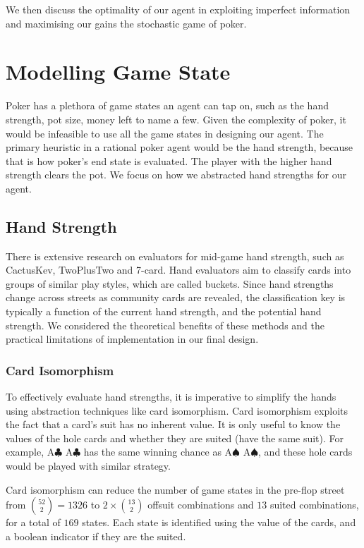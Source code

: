 \documentclass{article}
\begin{document}
We then discuss the optimality of our agent in exploiting imperfect information and maximising our gains the stochastic game of poker.

\section{Modelling Game State}
Poker has a plethora of game states an agent can tap on, such as the hand strength, pot size, money left to name a few. Given the complexity of poker, it would be infeasible to use all the game states in designing our agent. The primary heuristic in a rational poker agent would be the hand strength, because that is how poker's end state is evaluated. The player with the higher hand strength clears the pot. We focus on how we abstracted hand strengths for our agent.

\subsection{Hand Strength}
There is extensive research on evaluators for mid-game hand strength, such as CactusKev, TwoPlusTwo and 7-card. Hand evaluators aim to classify cards into groups of similar play styles, which are called buckets. Since hand strengths change across streets as community cards are revealed, the classification key is typically a function of the current hand strength, and the potential hand strength. We considered the theoretical benefits of these methods and the practical limitations of implementation in our final design.

\subsubsection{Card Isomorphism}
To effectively evaluate hand strengths, it is imperative to simplify the hands using abstraction techniques like card isomorphism. Card isomorphism exploits the fact that a card's suit has no inherent value. It is only useful to know the values of the hole cards and whether they are suited (have the same suit). For example, A$\clubsuit$ A$\clubsuit$ has the same winning chance as A$\spadesuit$ A$\spadesuit$, and these hole cards would be played with similar strategy.

Card isomorphism can reduce the number of game states in the pre-flop street from ${52 \choose 2} = 1326$ to $2 \times {13 \choose 2}$ offsuit combinations and $13$ suited combinations, for a total of $169$ states. Each state is identified using the value of the cards, and a boolean indicator if they are the suited.
\end{document}
